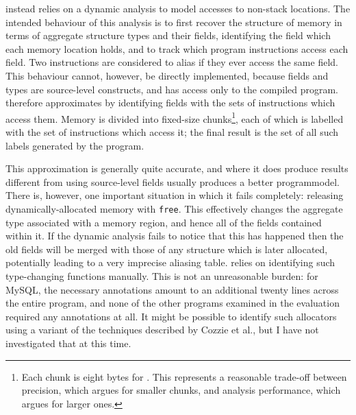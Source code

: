 {\Technique} instead relies on a dynamic analysis to model accesses to
non-stack locations.  The intended behaviour of this analysis is to
first recover the structure of memory in terms of aggregate structure
types and their fields, identifying the field which each memory
location holds, and to track which program instructions access each
field.  Two instructions are considered to alias if they ever access
the same field.  This behaviour cannot, however, be directly
implemented, because fields and types are source-level constructs, and
{\technique} has access only to the compiled program.  {\Technique}
therefore approximates by identifying fields with the sets of
instructions which access them.  Memory is divided into fixed-size
chunks\footnote{Each chunk is eight bytes for {\implementation}.  This
  represents a reasonable trade-off between precision, which argues
  for smaller chunks, and analysis performance, which argues for
  larger ones.}, each of which is labelled with the set of
instructions which access it; the final result is the set of all such
labels generated by the program.

This approximation is generally quite accurate, and where it does
produce results different from using source-level fields usually
produces a better \gls{programmodel}.  There is, however, one
important situation in which it fails completely: releasing
dynamically-allocated memory with \texttt{free}.  This effectively
changes the aggregate type associated with a memory region, and hence
all of the fields contained within it.  If the dynamic analysis fails
to notice that this has happened then the old fields will be merged
with those of any structure which is later allocated, potentially
leading to a very imprecise aliasing table.  {\Technique} relies on
identifying such type-changing functions manually.  This is not an
unreasonable burden: for MySQL, the necessary annotations amount to an
additional twenty lines across the entire program, and none of the
other programs examined in the evaluation required any annotations at
all.  It might be possible to identify such allocators using a variant
of the techniques described by Cozzie et al.\cite{Cozzie2008}, but I
have not investigated that at this time.


